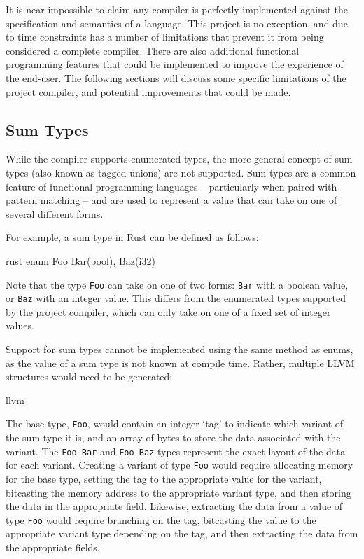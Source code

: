 It is near impossible to claim any compiler is perfectly implemented against the specification and
semantics of a language. This project is no exception, and due to time constraints has a number of
limitations that prevent it from being considered a complete compiler. There are also additional
functional programming features that could be implemented to improve the experience of the end-user.
The following sections will discuss some specific limitations of the project compiler, and potential
improvements that could be made.

\subsection{Sum Types}

While the compiler supports enumerated types, the more general concept of sum types (also known as
tagged unions) are not supported. Sum types are a common feature of functional programming languages
-- particularly when paired with pattern matching -- and are used to represent a value that can take
on one of several different forms.

For example, a sum type in Rust can be defined as follows:

\begin{code}{rust}
    enum Foo {
        Bar(bool),
        Baz(i32)
    }
\end{code}

Note that the type \texttt{Foo} can take on one of two forms: \texttt{Bar} with a boolean value, or
\texttt{Baz} with an integer value. This differs from the enumerated types supported by the project
compiler, which can only take on one of a fixed set of integer values.

Support for sum types cannot be implemented using the same method as enums, as the value of a sum
type is not known at compile time. Rather, multiple LLVM structures would need to be generated:

\begin{code}{llvm}
\end{code}

The base type, \texttt{Foo}, would contain an integer `tag' to indicate which variant of the sum
type it is, and an array of bytes to store the data associated with the variant. The
\texttt{Foo_Bar} and \texttt{Foo_Baz} types represent the exact layout of the data for each variant.
Creating a variant of type \texttt{Foo} would require allocating memory for the base type, setting
the tag to the appropriate value for the variant, bitcasting the memory address to the appropriate
variant type, and then storing the data in the appropriate field. Likewise, extracting the data from
a value of type \texttt{Foo} would require branching on the tag, bitcasting the value to the
appropriate variant type depending on the tag, and then extracting the data from the appropriate
fields.

